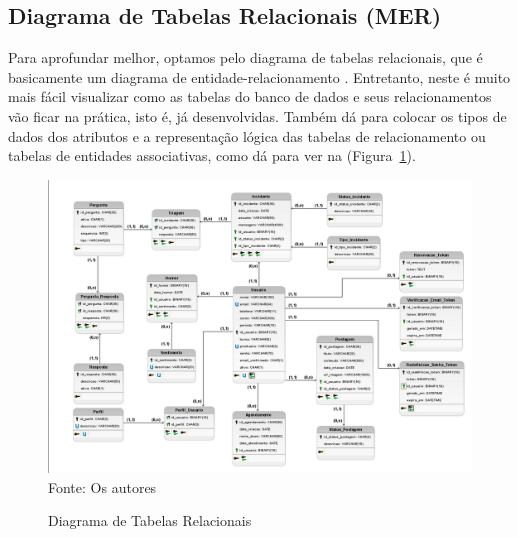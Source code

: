 \documentclass[12pt,a4paper]{article}
\begin{document}
\newpage

\subsection{Diagrama de Tabelas Relacionais (MER)}
Para aprofundar melhor, optamos pelo diagrama de tabelas relacionais, que é basicamente um diagrama de entidade-relacionamento \cite{luci}. Entretanto, neste é muito mais fácil visualizar como as tabelas do banco de dados e seus relacionamentos vão ficar na prática, isto é, já desenvolvidas. Também dá para colocar os tipos de dados dos atributos e a representação lógica das tabelas de relacionamento ou tabelas de entidades associativas, como dá para ver na (Figura~\ref{mer}).

\begin{figure}[H]
    \centering
    \caption{Diagrama de Tabelas Relacionais}
     \includegraphics[width=15cm]{mer.png}
    Fonte: Os autores
    \label{mer}
\end{figure}

\newpage

\thispagestyle{plain}
\titleformat{\section}{\Centering\large\bfseries}{}{0.0px}{}
{}
{}
%


\newpage
\thispagestyle{plain}
\thispagestyle{plain}
\printglossary

\newpage
\end{document}
